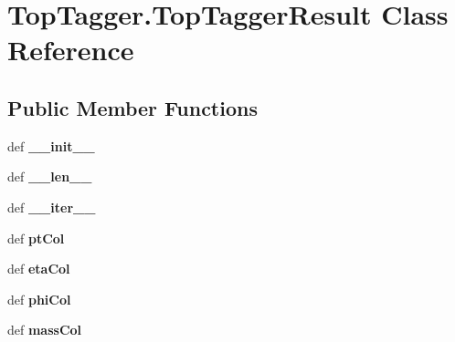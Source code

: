 \hypertarget{classTopTagger_1_1TopTaggerResult}{\section{Top\-Tagger.\-Top\-Tagger\-Result Class Reference}
\label{classTopTagger_1_1TopTaggerResult}
}
\subsection*{Public Member Functions}
\begin{DoxyCompactItemize}
\item 
\hypertarget{classTopTagger_1_1TopTaggerResult_aad1eaf2adaf99ff9f91221c88901dd69}{def {\bfseries \-\_\-\-\_\-init\-\_\-\-\_\-}}\label{classTopTagger_1_1TopTaggerResult_aad1eaf2adaf99ff9f91221c88901dd69}

\item 
\hypertarget{classTopTagger_1_1TopTaggerResult_ac12e28eac79f627697ee39ea0ad1e891}{def {\bfseries \-\_\-\-\_\-len\-\_\-\-\_\-}}\label{classTopTagger_1_1TopTaggerResult_ac12e28eac79f627697ee39ea0ad1e891}

\item 
\hypertarget{classTopTagger_1_1TopTaggerResult_af6d7a28866c54d7b6251e6e107b4bc3e}{def {\bfseries \-\_\-\-\_\-iter\-\_\-\-\_\-}}\label{classTopTagger_1_1TopTaggerResult_af6d7a28866c54d7b6251e6e107b4bc3e}

\item 
\hypertarget{classTopTagger_1_1TopTaggerResult_a208c32e56b8c12070b8f5ffe01e2c549}{def {\bfseries pt\-Col}}\label{classTopTagger_1_1TopTaggerResult_a208c32e56b8c12070b8f5ffe01e2c549}

\item 
\hypertarget{classTopTagger_1_1TopTaggerResult_a317424d14d152695ff7306ac4b80f231}{def {\bfseries eta\-Col}}\label{classTopTagger_1_1TopTaggerResult_a317424d14d152695ff7306ac4b80f231}

\item 
\hypertarget{classTopTagger_1_1TopTaggerResult_a04eb7ee0366cb165caa9c02ca13cef13}{def {\bfseries phi\-Col}}\label{classTopTagger_1_1TopTaggerResult_a04eb7ee0366cb165caa9c02ca13cef13}

\item 
\hypertarget{classTopTagger_1_1TopTaggerResult_a449fe51a1fc16da4043d9a25b762b7c2}{def {\bfseries mass\-Col}}\label{classTopTagger_1_1TopTaggerResult_a449fe51a1fc16da4043d9a25b762b7c2}


\end{DoxyCompactItemize}
